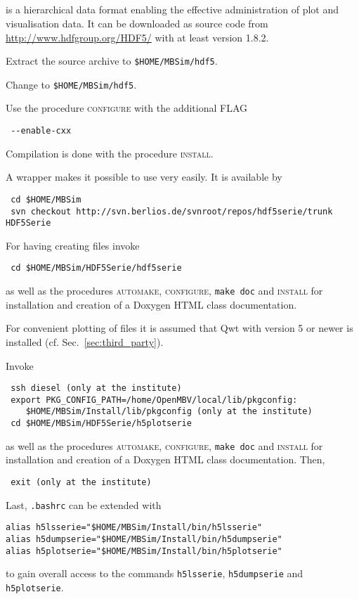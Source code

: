 \subsection{\HDF}
\HDF{} is a hierarchical data format enabling the effective administration of plot and visualisation data. It can be downloaded as source code from \url{http://www.hdfgroup.org/HDF5/} with at least version 1.8.2.\par
Extract the source archive to \texttt{\$HOME/MBSim/hdf5}.\par
Change to \texttt{\$HOME/MBSim/hdf5}.\par
Use the procedure \textsc{configure} with the additional FLAG
\begin{verbatim}
 --enable-cxx
\end{verbatim}
Compilation is done with the procedure \textsc{install}.\par
A \HDF{} wrapper makes it possible to use \HDF{} very easily. It is available by
\begin{verbatim}
 cd $HOME/MBSim
 svn checkout http://svn.berlios.de/svnroot/repos/hdf5serie/trunk HDF5Serie
\end{verbatim}
For having \MBSim{} creating \HDF{} files invoke
\begin{verbatim}
 cd $HOME/MBSim/HDF5Serie/hdf5serie
\end{verbatim}
as well as the procedures \textsc{automake, configure}, \texttt{make doc} and \textsc{install} for installation and creation of a Doxygen HTML class documentation.\par
For convenient plotting of \HDF{} files it is assumed that Qwt with version 5 or newer is installed (cf. Sec.~\ref{sec:third_party}).\par
Invoke 
\begin{verbatim}
 ssh diesel (only at the institute)
 export PKG_CONFIG_PATH=/home/OpenMBV/local/lib/pkgconfig:
    $HOME/MBSim/Install/lib/pkgconfig (only at the institute)
 cd $HOME/MBSim/HDF5Serie/h5plotserie
\end{verbatim}
as well as the procedures \textsc{automake, configure}, \texttt{make doc} and \textsc{install} for installation and creation of a Doxygen HTML class documentation. Then,
\begin{verbatim}
 exit (only at the institute)
\end{verbatim}
Last, \texttt{.bashrc} can be extended with
\begin{verbatim}
alias h5lsserie="$HOME/MBSim/Install/bin/h5lsserie"
alias h5dumpserie="$HOME/MBSim/Install/bin/h5dumpserie"
alias h5plotserie="$HOME/MBSim/Install/bin/h5plotserie"
\end{verbatim}
to gain overall access to the commands \texttt{h5lsserie}, \texttt{h5dumpserie} and \texttt{h5plotserie}.

